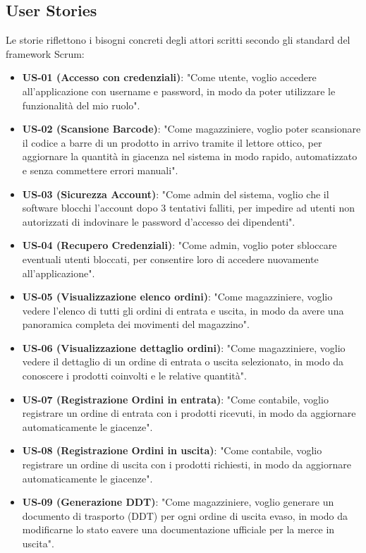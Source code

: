 \documentclass[a4paper,12pt]{article}
\begin{document}
\subsection{User Stories}
Le storie riflettono i bisogni concreti degli attori scritti secondo gli standard del framework Scrum:
\begin{itemize}
    \item \textbf{US-01 (Accesso con credenziali)}: "Come utente, voglio accedere all'applicazione con username e password, in modo da poter utilizzare le funzionalità del mio ruolo".
    \item \textbf{US-02 (Scansione Barcode)}: "Come magazziniere, voglio poter scansionare il codice a barre di un prodotto in arrivo tramite il lettore ottico, per aggiornare la quantità in giacenza nel sistema in modo rapido, automatizzato e senza commettere errori manuali".
    \item \textbf{US-03 (Sicurezza Account)}: "Come admin del sistema, voglio che il software blocchi l'account dopo 3 tentativi falliti, per impedire ad utenti non autorizzati di indovinare le password d'accesso dei dipendenti".
    \item \textbf{US-04 (Recupero Credenziali)}: "Come admin, voglio poter sbloccare eventuali utenti bloccati, per consentire loro di accedere nuovamente all'applicazione".
    \item \textbf{US-05 (Visualizzazione elenco ordini)}: "Come magazziniere, voglio vedere l'elenco di tutti gli ordini di entrata e uscita, in modo da avere una panoramica completa dei movimenti del magazzino".
    \item \textbf{US-06 (Visualizzazione dettaglio ordini)}: "Come magazziniere, voglio vedere il dettaglio di un ordine di entrata o uscita selezionato, in modo da conoscere i prodotti coinvolti e le relative quantità".
    \item \textbf{US-07 (Registrazione Ordini in entrata)}: "Come contabile, voglio registrare un ordine di entrata con i prodotti ricevuti, in modo da aggiornare automaticamente le giacenze".
    \item \textbf{US-08 (Registrazione Ordini in uscita)}: "Come contabile, voglio registrare un ordine di uscita con i prodotti richiesti, in modo da aggiornare automaticamente le giacenze".
    \item \textbf{US-09 (Generazione DDT)}: "Come magazziniere, voglio generare un documento di trasporto (DDT) per ogni ordine di uscita evaso, in modo da modificarne lo stato eavere una documentazione ufficiale per la merce in uscita".

\end{itemize}
\end{document}
